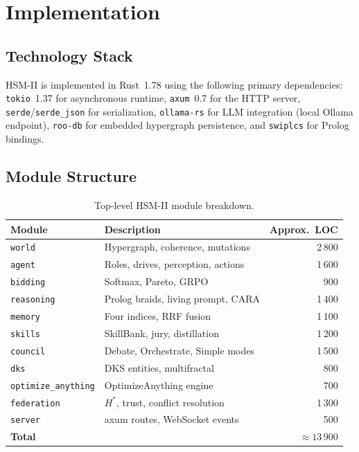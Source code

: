 \documentclass[11pt]{article}
\begin{document}
\section{Implementation}
\label{sec:impl}

\subsection{Technology Stack}

HSM-II is implemented in Rust~1.78 using the following primary dependencies:
\texttt{tokio}~1.37 for asynchronous runtime, \texttt{axum}~0.7 for the HTTP
server, \texttt{serde}/\texttt{serde\_json} for serialization,
\texttt{ollama-rs} for LLM integration (local Ollama endpoint),
\texttt{roo-db} for embedded hypergraph persistence, and
\texttt{swiplcs} for Prolog bindings.

\subsection{Module Structure}

\begin{table}[H]
\centering
\caption{Top-level HSM-II module breakdown.}
\label{tab:modules}
\small
{}
\begin{tabular}{llr}
\toprule
\textbf{Module} & \textbf{Description} & \textbf{Approx.\ LOC} \\
\midrule
\texttt{world}           & Hypergraph, coherence, mutations   & 2\,800 \\
\texttt{agent}           & Roles, drives, perception, actions & 1\,600 \\
\texttt{bidding}         & Softmax, Pareto, GRPO              & 900 \\
\texttt{reasoning}       & Prolog braids, living prompt, CARA & 1\,400 \\
\texttt{memory}          & Four indices, RRF fusion           & 1\,100 \\
\texttt{skills}          & SkillBank, jury, distillation      & 1\,200 \\
\texttt{council}         & Debate, Orchestrate, Simple modes  & 1\,500 \\
\texttt{dks}             & DKS entities, multifractal         & 800 \\
\texttt{optimize\_anything} & OptimizeAnything engine         & 700 \\
\texttt{federation}      & $H^*$, trust, conflict resolution  & 1\,300 \\
\texttt{server}          & axum routes, WebSocket events      & 500 \\
\midrule
\textbf{Total}           &                                    & $\approx\!13\,900$ \\
\bottomrule
\end{tabular}
\end{table}
\end{document}
